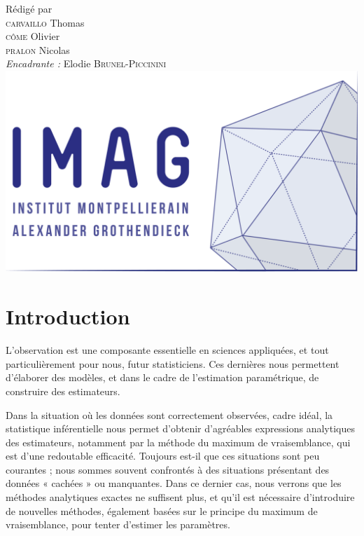 \documentclass[frenchb]{report}
\newcommand{\1}{\mathbbm{1}}
\theoremstyle{definition}\newtheorem{defn}{Définition}
\theoremstyle{definition}\newtheorem{exm}{Exemple}
\theoremstyle{definition}\newtheorem{nota}{Notation}
\theoremstyle{definition}\newtheorem{rem}{Remarque}
\begin{document}
\begin{titlepage}
\begin{center}
{\large Rédigé par\\}
{\Large \textsc{carvaillo} Thomas}\\
{\Large \textsc{côme} Olivier}\\
{\Large \textsc{pralon} Nicolas}\\[1cm]
{\large \emph{Encadrante :} Elodie \textsc{Brunel-Piccinini}}\\[1.5cm] 

\includegraphics[scale=0.7]{imag_logo.png}

\end{center}
\end{titlepage}
\tableofcontents
\newpage

\chapter*{Introduction}

L’observation est une composante essentielle en sciences appliquées, et tout particulièrement pour nous, futur statisticiens. Ces dernières nous permettent d’élaborer des modèles, et dans le cadre de l’estimation paramétrique, de construire des estimateurs.

Dans la situation où les données sont correctement observées, cadre idéal, la statistique inférentielle nous permet d’obtenir d’agréables expressions analytiques des estimateurs, notamment par la méthode du maximum de vraisemblance, qui est d'une redoutable efficacité. Toujours est-il que ces situations sont peu courantes ; nous sommes souvent confrontés à des situations présentant des données « cachées » ou manquantes. Dans ce dernier cas, nous verrons que les méthodes analytiques exactes ne suffisent plus, et qu’il est nécessaire d’introduire de nouvelles méthodes, également 	basées sur le principe du maximum de vraisemblance, pour tenter d’estimer les paramètres.
\end{document}
